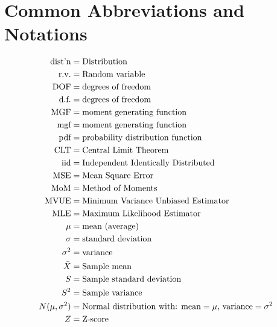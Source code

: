 \section*{Common Abbreviations and Notations}
\begin{align*}
    \text{dist'n} &= \text{Distribution}\\
    \text{r.v.} &= \text{Random variable}\\
    \text{DOF} &= \text{degrees of freedom} \\
    \text{d.f.} &= \text{degrees of freedom} \\
    \text{MGF} &= \text{moment generating function} \\
    \text{mgf} &= \text{moment generating function}\\
    \text{pdf} &= \text{probability distribution function}\\
    \text{CLT} &= \text{Central Limit Theorem}\\
    \text{iid} &= \text{Independent Identically Distributed}\\
    \text{MSE} &= \text{Mean Square Error}\\
    \text{MoM} &= \text{Method of Moments}\\
    \text{MVUE} &= \text{Minimum Variance Unbiased Estimator}\\
    \text{MLE} &= \text{Maximum Likelihood Estimator}\\
    \mu &= \text{mean (average)}\\
    \sigma &= \text{standard deviation}\\
    \sigma^2 &= \text{variance}\\
    \bar{X} &= \text{Sample mean}\\
    S &= \text{Sample standard deviation}\\
    S^2 &= \text{Sample variance}\\
    N(\mu,\sigma^2) &= \text{Normal distribution with: mean} = \mu \text{, variance} = \sigma^2\\
    Z &= \text{Z-score}
\end{align*}
